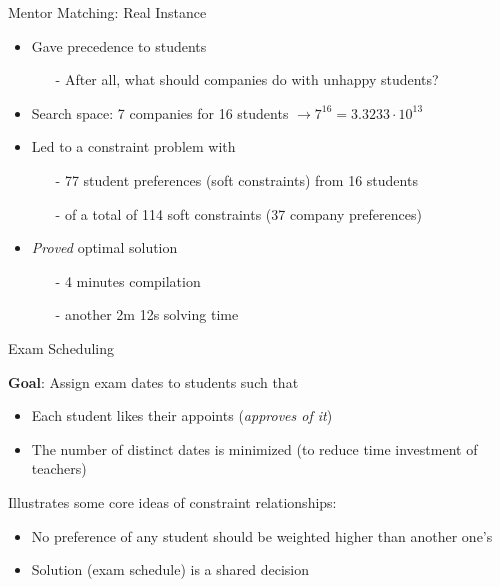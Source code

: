 \documentclass[10pt,xcolor={dvipsnames},fleqn]{beamer}
\begin{document}
\begin{frame}[fragile]{Mentor Matching: Real Instance}
\begin{itemize}
\item Gave precedence to \alert{students}
\begin{itemize}
\item[-] After all, what should companies do with unhappy students?
\end{itemize}
\item Search space: 7 companies for 16 students $\rightarrow 7^{16} = 3.3233 \cdot 10^{13}$
\vspace*{2ex}
\item Led to a constraint problem with 
\begin{itemize}
\item[-] 77 student preferences (soft constraints) from 16 students
\item[-] of a total of 114 soft constraints (37 company preferences) 
\end{itemize}

\vspace*{2ex}

\item \emph{Proved} optimal solution 
\begin{itemize}
\item[-] 4 minutes compilation 
\item[-] another 2m 12s solving time
\end{itemize}
\end{itemize}
\end{frame}


\begin{frame}[fragile]{Exam Scheduling}

\textbf{Goal}: Assign exam dates to students such that 
\begin{itemize}
\item Each student likes their appoints (\emph{approves of it})
\item The number of distinct dates is minimized (to reduce time investment of teachers)
\end{itemize}

\vspace*{2ex}

Illustrates some core ideas of constraint relationships:

\begin{itemize}
\item No preference of any student should be weighted higher than another one's
\item Solution (exam schedule) is a shared decision

\end{itemize}
\end{frame}
\end{document}
